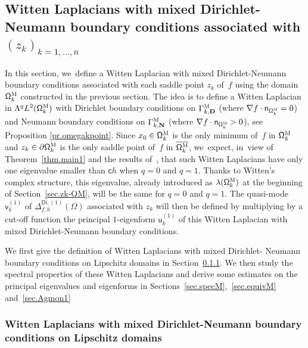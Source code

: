 \documentclass[JEP,XML,SOM,Unicode,NoEqCountersInSection,NoFloatCountersInSection,published]{cedram}
\newcommand{\mbf}[1]{\mathbf{#1}}
\let\pa\partial
\theoremstyle{plain}
\theoremstyle{definition}
\begin{document}
\subsection{Witten Laplacians with mixed Dirichlet-Neumann boundary conditions associated with $(z_k)_{k=1,\ldots,n}$}
\label{sec.Witten-TN}

In this section, we~define a Witten Laplacian with mixed Dirichlet-Neumann boundary conditions associated with each saddle point $z_k$ of~$f$ using the domain $\mathsf \Omega_k^{\textsc{M}}$ constructed in the previous section. The idea is to define a Witten Laplacian in $\Lambda^qL^2(\mathsf \Omega_k^{\textsc{M}})$ with
Dirichlet boundary conditions on $\Gamma_{k,\mbf D}^{\textsc{M}}$ (where $ \nabla f\cdot \mathsf n_{ \mathsf \Omega_k^{\textsc{M}} } =0$) and Neumann boundary conditions on $\Gamma_{k,\mbf N}^{\textsc{M}}$ (where $ \nabla f\cdot \mathsf n_{ \mathsf \Omega_k^{\textsc{M}} } >0$), see Proposition \ref{pr.omegakpoint}. Since $x_0\in \mathsf \Omega_k^{\textsc{M}}$ is the only minimum of~$f$ in $\mathsf \Omega_k^{\textsc{M}}$ and $z_k\in \pa \mathsf \Omega_k^{\textsc{M}}$ is the only saddle point of~$f$ in $\overline{ \mathsf \Omega_k^{\textsc{M}}}$, we~expect, in~view of Theorem~\ref{thm.main1} and the results of~\cite{le-peutrec-10}, that such Witten Laplacians have only one eigenvalue smaller than $\mathsf ch$ when $q=0$ and $q=1$.
Thanks to Witten's complex structure,
this eigenvalue, already introduced as $\lambda(\mathsf
\Omega_k^{\textsc{M}})$ at the beginning of Section~\ref{sec.zk-QM},
will be the same for $q=0$ and $q=1$. The quasi-mode $\mathsf
v_k^{(1)} $ of $\Delta_{f,h}^{\mathsf{Di},(1)}(\Omega)$ associated
with $z_k$ will then be defined by multiplying by a cut-off function the principal $1$-eigenform $\mathsf u_k^{(1)}$ of this Witten Laplacian with mixed Dirichlet-Neumann boundary conditions.

We first give the definition of Witten Laplacians with mixed
Dirichlet- Neumann boundary conditions on
Lipschitz domains in Section~\ref{sec.Witten-general-result}. We
then study the spectral properties of these Witten Laplacians and
derive some estimates on the principal eigenvalues and eigenforms in
Sections~\ref{sec.specM},~\ref{sec.equivM} and~\ref{sec.Agmon1}

\subsubsection{Witten Laplacians with mixed
Dirichlet-Neumann boundary conditions on Lipschitz domains}
\label{sec.Witten-general-result}
\end{document}
